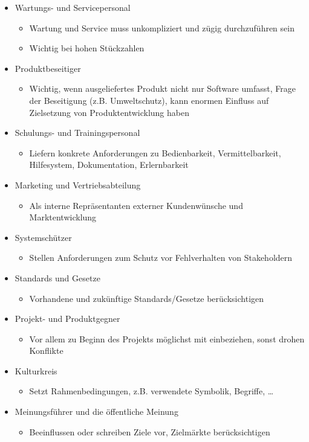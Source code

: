 \documentclass[11pt, a4paper]{article}
\begin{document}
\begin{itemize}
    \item Wartungs- und Servicepersonal
    \begin{itemize}
        \item Wartung und Service muss unkompliziert und zügig durchzuführen sein
        \item Wichtig bei hohen Stückzahlen
    \end{itemize}
    \item Produktbeseitiger
    \begin{itemize}
        \item Wichtig, wenn ausgeliefertes Produkt nicht nur Software umfasst, Frage der Beseitigung (z.B. Umweltschutz), kann enormen Einfluss auf Zielsetzung von Produktentwicklung haben
    \end{itemize}
    \item Schulungs- und Trainingspersonal
    \begin{itemize}
        \item Liefern konkrete Anforderungen zu Bedienbarkeit, Vermittelbarkeit, Hilfesystem, Dokumentation, Erlernbarkeit
    \end{itemize}
    \item Marketing und Vertriebsabteilung
    \begin{itemize}
        \item Als interne Repräsentanten externer Kundenwünsche und Marktentwicklung
    \end{itemize}
    \item Systemschützer
    \begin{itemize}
        \item Stellen Anforderungen zum Schutz vor Fehlverhalten von Stakeholdern
    \end{itemize}
    \item Standards und Gesetze
    \begin{itemize}
        \item Vorhandene und zukünftige Standards/Gesetze berücksichtigen
    \end{itemize}
    \item Projekt- und Produktgegner
    \begin{itemize}
        \item Vor allem zu Beginn des Projekts möglichst mit einbeziehen, sonst drohen Konflikte
    \end{itemize}
    \item Kulturkreis
    \begin{itemize}
        \item Setzt Rahmenbedingungen, z.B. verwendete Symbolik, Begriffe, …
    \end{itemize}
    \item Meinungsführer und die öffentliche Meinung
    \begin{itemize}
        \item Beeinflussen oder schreiben Ziele vor, Zielmärkte berücksichtigen
    \end{itemize}
\end{itemize}
\end{document}
